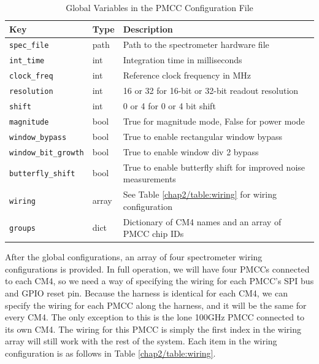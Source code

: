\begin{table}[ht!]
    \centering
    \begin{tabularx}{\textwidth}{l|l|X}
        \textbf{Key} & \textbf{Type} & \textbf{Description} \\ \hline    
        \texttt{spec\_file} & path & Path to the spectrometer hardware file \\
        \texttt{int\_time} & int & Integration time in milliseconds \\
        \texttt{clock\_freq} & int & Reference clock frequency in MHz \\
        \texttt{resolution} & int & 16 or 32 for 16-bit or 32-bit readout resolution \\
        \texttt{shift} & int & 0 or 4 for 0 or 4 bit shift \\
        \texttt{magnitude} & bool & True for magnitude mode, False for power mode \\
        \texttt{window\_bypass} & bool & True to enable rectangular window bypass \\
        \texttt{window\_bit\_growth} & bool & True to enable window div 2 bypass \\
        \texttt{butterfly\_shift} & bool & True to enable butterfly shift for improved noise measurements \\
        \texttt{wiring} & array & See Table \ref{chap2/table:wiring} for wiring configuration \\
        \texttt{groups} & dict & Dictionary of CM4 names and an array of PMCC chip IDs  \\
    \end{tabularx}
    \label{chap2/table:pmcc_config}
    \caption{Global Variables in the PMCC Configuration File}
\end{table}

After the global configurations, an array of four spectrometer wiring configurations is provided. 
In full operation, we will have four PMCCs connected to each CM4, so we need a way of specifying the wiring for each PMCC's SPI bus and GPIO reset pin.
Because the harness is identical for each CM4, we can specify the wiring for each PMCC along the harness, and it will be the same for every CM4. 
The only exception to this is the lone 100GHz PMCC connected to its own CM4. 
The wiring for this PMCC is simply the first index in the wiring array will still work with the rest of the system.
Each item in the wiring configuration is as follows in Table \ref{chap2/table:wiring}.

